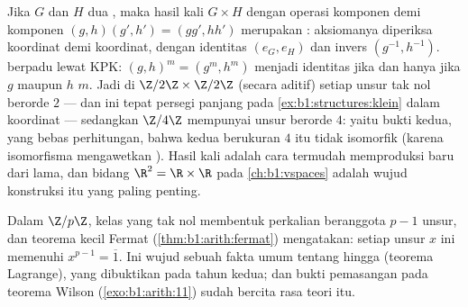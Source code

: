 \begin{example}\label{ex:b1:structures:product}
Jika $G$ dan $H$ dua , maka  hasil kali $G \times H$ dengan
operasi komponen demi komponen $(g, h)(g', h') = (gg', hh')$ merupakan :
aksiomanya diperiksa koordinat demi koordinat, dengan identitas
$(e_G, e_H)$ dan invers $(g^{-1}, h^{-1})$.  berpadu lewat
KPK: $(g, h)^m = (g^m, h^m)$ menjadi identitas jika dan hanya jika 
$g$ maupun  $h$  $m$. Jadi di $\Z/2\Z
\times \Z/2\Z$ (secara aditif) setiap unsur tak nol berorde $2$
--- dan ini tepat  persegi panjang pada
\cref{ex:b1:structures:klein} dalam koordinat --- sedangkan $\Z/4\Z$
mempunyai unsur berorde $4$: yaitu bukti kedua, yang bebas perhitungan,
bahwa kedua  berukuran $4$ itu tidak isomorfik (karena
isomorfisma mengawetkan ). Hasil kali adalah cara termudah
memproduksi  baru dari  lama, dan bidang $\R^2 = \R \times
\R$ pada \cref{ch:b1:vspaces} adalah wujud konstruksi itu yang paling
penting.
\end{example}

\begin{remark}
Dalam  $\Z/p\Z$, kelas yang tak nol membentuk  perkalian
beranggota $p - 1$ unsur, dan teorema kecil Fermat
(\cref{thm:b1:arith:fermat}) mengatakan: setiap unsur $x$  ini
memenuhi $x^{p-1} = \overline 1$. Ini wujud sebuah fakta umum
tentang  hingga (teorema Lagrange), yang dibuktikan pada tahun
kedua; dan bukti pemasangan pada teorema Wilson
(\cref{exo:b1:arith:11}) sudah bercita rasa teori  itu.
\end{remark}

